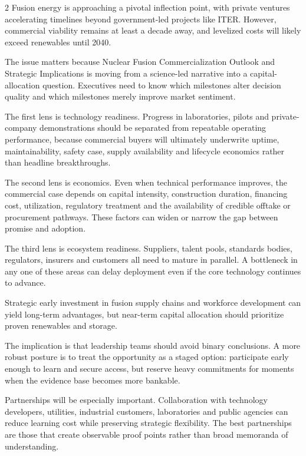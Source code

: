 \documentclass[10pt,a4paper]{article}
\begin{document}
\begin{multicols}{2}
{\small Fusion energy is approaching a pivotal inflection point, with private ventures accelerating timelines beyond government-led projects like ITER. However, commercial viability remains at least a decade away, and levelized costs will likely exceed renewables until 2040.}\par
{\small The issue matters because Nuclear Fusion Commercialization Outlook and Strategic Implications is moving from a science-led narrative into a capital-allocation question. Executives need to know which milestones alter decision quality and which milestones merely improve market sentiment.}\par
{\small The first lens is technology readiness. Progress in laboratories, pilots and private-company demonstrations should be separated from repeatable operating performance, because commercial buyers will ultimately underwrite uptime, maintainability, safety case, supply availability and lifecycle economics rather than headline breakthroughs.}\par
{\small The second lens is economics. Even when technical performance improves, the commercial case depends on capital intensity, construction duration, financing cost, utilization, regulatory treatment and the availability of credible offtake or procurement pathways. These factors can widen or narrow the gap between promise and adoption.}\par
{\small The third lens is ecosystem readiness. Suppliers, talent pools, standards bodies, regulators, insurers and customers all need to mature in parallel. A bottleneck in any one of these areas can delay deployment even if the core technology continues to advance.}\par
{\small Strategic early investment in fusion supply chains and workforce development can yield long-term advantages, but near-term capital allocation should prioritize proven renewables and storage.}\par
{\small The implication is that leadership teams should avoid binary conclusions. A more robust posture is to treat the opportunity as a staged option: participate early enough to learn and secure access, but reserve heavy commitments for moments when the evidence base becomes more bankable.}\par
{\small Partnerships will be especially important. Collaboration with technology developers, utilities, industrial customers, laboratories and public agencies can reduce learning cost while preserving strategic flexibility. The best partnerships are those that create observable proof points rather than broad memoranda of understanding.}\par
\end{multicols}
\end{document}
